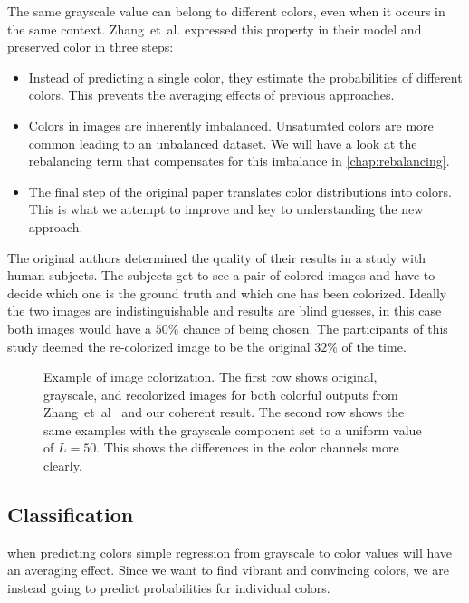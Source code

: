\documentclass[11pt]{article}
\begin{document}
The same grayscale value can belong to different colors, even when it occurs in the same context. Zhang~et~al.\cite{zhang2016colorful} expressed this property in their model and preserved color in three steps:

\begin{itemize}
    \item Instead of predicting a single color, they estimate the probabilities of different colors. This prevents the averaging effects of previous approaches.
    \item Colors in images are inherently imbalanced. Unsaturated colors are more common leading to an unbalanced dataset. We will have a look at the rebalancing term that compensates for this imbalance in \autoref{chap:rebalancing}.
    \item The final step of the original paper translates color distributions into colors. This is what we attempt to improve and key to understanding the new approach.
\end{itemize}

The original authors determined the quality of their results in a study with human subjects. The subjects get to see a pair of colored images and have to decide which one is the ground truth and which one has been colorized. Ideally the two images are indistinguishable and results are blind guesses, in this case both images would have a $50\%$ chance of being chosen. The participants of this study deemed the re-colorized image to be the original $32\%$ of the time. 

\begin{figure}
    
    \caption{
    Example of image colorization. The first row shows original, grayscale, and recolorized images for both colorful outputs from Zhang~et~al~\cite{zhang2016colorful} and our coherent result.
    The second row shows the same examples with the grayscale component set to a uniform value of $L=50$. This shows the differences in the color channels more clearly.
    }
    \label{fig:example}
\end{figure}

\subsection{Classification}
\label{chap:classification}
when predicting colors simple regression from grayscale to color values will have an averaging effect. Since we want to find vibrant and convincing colors, we are instead going to predict probabilities for individual colors.
\end{document}
